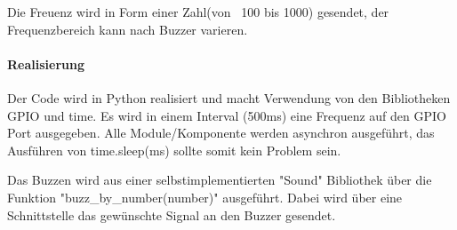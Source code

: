 \documentclass[../../main.tex]{subfiles}
\begin{document}
Die Freuenz wird in Form einer Zahl(von ~100 bis 1000) gesendet, der Frequenzbereich kann nach Buzzer varieren.

\paragraph{Realisierung}
Der Code wird in Python realisiert und macht Verwendung von den Bibliotheken GPIO und time. Es wird in einem Interval (500ms) eine Frequenz auf den GPIO Port ausgegeben. Alle Module/Komponente werden asynchron ausgeführt, das Ausführen von time.sleep(ms) sollte somit kein Problem sein.

Das Buzzen wird aus einer selbstimplementierten "Sound" Bibliothek über die Funktion "buzz\_by\_number(number)" ausgeführt. Dabei wird über eine Schnittstelle das gewünschte Signal an den Buzzer gesendet.
\end{document}
